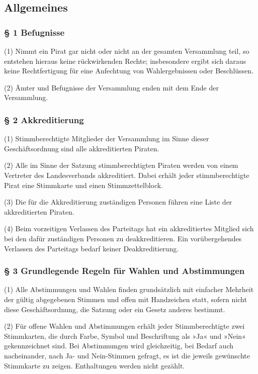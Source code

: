 \subsection{Allgemeines}

\subsubsection{§ 1 Befugnisse}

(1) Nimmt ein Pirat gar nicht oder nicht an der gesamten Versammlung
teil, so entstehen hieraus keine rückwirkenden Rechte; insbesondere
ergibt sich daraus keine Rechtfertigung für eine Anfechtung von
Wahlergebnissen oder Beschlüssen.

(2) Ämter und Befugnisse der Versammlung enden mit dem Ende der
Versammlung.

\subsubsection{§ 2 Akkreditierung}

(1) Stimmberechtigte Mitglieder der Versammlung im Sinne dieser
Geschäftsordnung sind alle akkreditierten Piraten.

(2) Alle im Sinne der Satzung stimmberechtigten Piraten werden von einem
Vertreter des Landesverbands akkreditiert. Dabei erhält jeder
stimmberechtigte Pirat eine Stimmkarte und einen Stimmzettelblock.

(3) Die für die Akkreditierung zuständigen Personen führen eine Liste
der akkreditierten Piraten.

(4) Beim vorzeitigen Verlassen des Parteitags hat ein akkreditiertes
Mitglied sich bei den dafür zuständigen Personen zu deakkreditieren. Ein
vorübergehendes Verlassen des Parteitags bedarf keiner Deakkreditierung.

\subsubsection{§ 3 Grundlegende Regeln für Wahlen und Abstimmungen}

(1) Alle Abstimmungen und Wahlen finden grundsätzlich mit einfacher
Mehrheit der gültig abgegebenen Stimmen und offen mit Handzeichen statt,
sofern nicht diese Geschäftsordnung, die Satzung oder ein Gesetz anderes
bestimmt.

(2) Für offene Wahlen und Abstimmungen erhält jeder Stimmberechtigte
zwei Stimmkarten, die durch Farbe, Symbol und Beschriftung als »Ja« und
»Nein« gekennzeichnet sind. Bei Abstimmungen wird gleichzeitig, bei
Bedarf auch nacheinander, nach Ja- und Nein-Stimmen gefragt, es ist die
jeweils gewünschte Stimmkarte zu zeigen. Enthaltungen werden nicht
gezählt.

